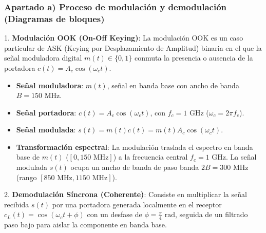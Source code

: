 \begin{resolucion}
{\begin{resolucion}
\subsubsection*{Apartado a) Proceso de modulación y demodulación (Diagramas de bloques)}

1. \textbf{Modulación OOK (On-Off Keying)}:
   La modulación OOK es un caso particular de ASK (Keying por Desplazamiento de Amplitud) binaria en el que la señal moduladora digital $m(t) \in \{0, 1\}$ conmuta la presencia o ausencia de la portadora $c(t) = A_c \cos(\omega_c t)$.

   \begin{itemize}
       \item \textbf{Señal moduladora}: $m(t)$, señal en banda base con ancho de banda $B = 150\text{ MHz}$.
       \item \textbf{Señal portadora}: $c(t) = A_c \cos(\omega_c t)$, con $f_c = 1\text{ GHz}$ ($\omega_c = 2\pi f_c$).
       \item \textbf{Señal modulada}: $s(t) = m(t) c(t) = m(t) A_c \cos(\omega_c t)$.
       \item \textbf{Transformación espectral}: La modulación traslada el espectro en banda base de $m(t)$ ($[0, 150\text{ MHz}]$) a la frecuencia central $f_c = 1\text{ GHz}$. La señal modulada $s(t)$ ocupa un ancho de banda de paso banda $2B = 300\text{ MHz}$ (rango $[850\text{ MHz}, 1150\text{ MHz}]$).
   \end{itemize}


2. \textbf{Demodulación Síncrona (Coherente)}:
   Consiste en multiplicar la señal recibida $s(t)$ por una portadora generada localmente en el receptor $c_L(t) = \cos(\omega_c t + \phi)$ con un desfase de $\phi = \frac{\pi}{4}\text{ rad}$, seguida de un filtrado paso bajo para aislar la componente en banda base.



\end{resolucion}}
\end{resolucion}
